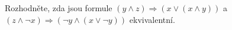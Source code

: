 \subsubsection{}
Rozhodněte, zda jsou formule $(y\wedge z)\Rightarrow (x \vee (x\wedge y))$ a
$(z\wedge \neg x)\Rightarrow (\neg y\wedge (x\vee \neg y))$ ekvivalentní.
